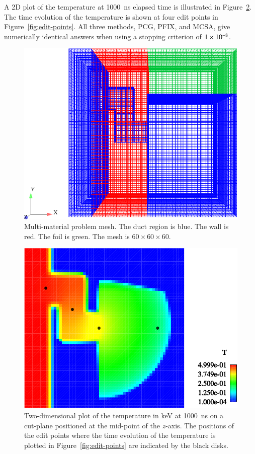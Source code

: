 \documentclass[preprint,12pt]{elsarticle}
\begin{document}
A 2D plot of the temperature at 1000~ns elapsed time is illustrated in
Figure~\ref{fig:multi-mat_T}.  The time evolution of the temperature is shown at
four edit points in Figure~\ref{fig:edit-points}.  All three methods, PCG, PFIX,
and MCSA, give numerically identical answers when using a stopping criterion
of $1\times 10^{-8}$.
\begin{figure}[ht!]
  \centerline{ \includegraphics[width=5in,clip]{mesh.pdf}}
  \caption{Multi-material problem mesh.  The duct region is blue.  The wall is
    red.  The foil is green.  The mesh is $60\times 60\times 60$.}
  \label{fig:multi-mat-mesh}
\end{figure}

\begin{figure}[ht!]
  \centerline{ \includegraphics[width=5in,clip]{T_multi_mat.pdf}}
  \caption{ Two-dimensional plot of the temperature in keV at 1000~ns
    on a cut-plane positioned at the mid-point of the $z$-axis.  The
    positions of the edit points where the time evolution of the
    temperature is plotted in Figure~\ref{fig:edit-points} are
    indicated by the black disks.}
  \label{fig:multi-mat_T}
\end{figure}
\end{document}
